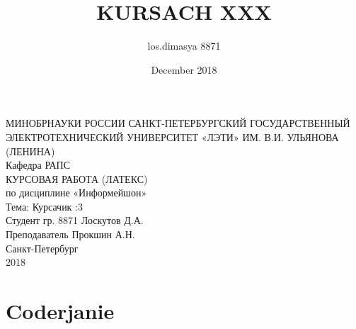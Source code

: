 \documentclass[14pt]{extreport}
\title{KURSACH XXX}
\author{los.dimasya 8871}
\date{December 2018}
\begin{document}
\maketitle
\centering МИНОБРНАУКИ РОССИИ
САНКТ-ПЕТЕРБУРГСКИЙ ГОСУДАРСТВЕННЫЙ
ЭЛЕКТРОТЕХНИЧЕСКИЙ УНИВЕРСИТЕТ 
«ЛЭТИ» ИМ. В.И. УЛЬЯНОВА (ЛЕНИНА)\\[1cm]

Кафедра РАПС\\[3cm]

КУРСОВАЯ РАБОТА (ЛАТЕКС)\\[0.2cm]
по дисциплине «Информейшон»\\[0.2cm]
Тема: Курсачик :3\\[5cm]

Студент гр. 8871 \hspace{4cm}		Лоскутов Д.А.\\[0.4cm]
Преподаватель \hspace{4cm}		Прокшин А.Н.\\[2cm]

Санкт-Петербург\\[0.5cm]
2018

\newpage

\chapter{Coderjanie}
\end{document}
